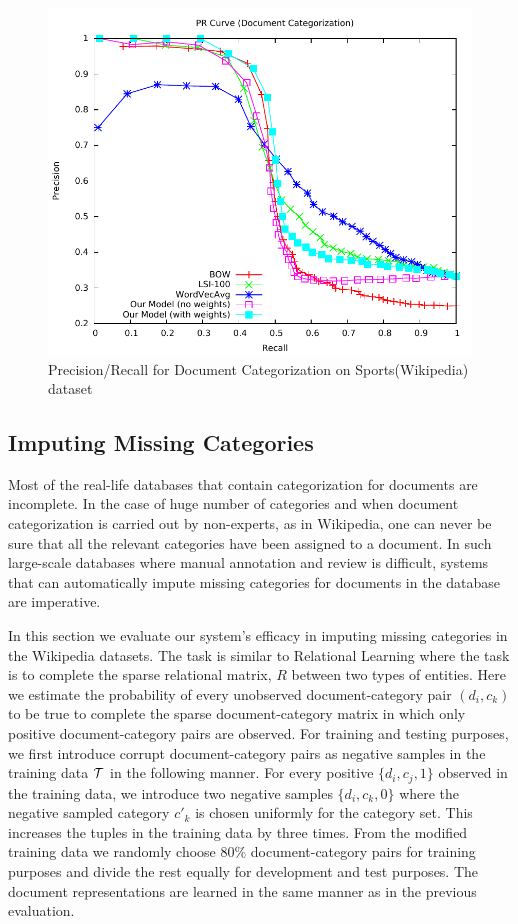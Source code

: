 \begin{figure}[tb]
\centering
        \includegraphics[width=0.8\columnwidth]{figs/pr/sports-cs-scala.pdf}
        \vskip -4mm
    \caption{Precision/Recall for Document Categorization on Sports(Wikipedia) dataset}
    \label{fig:pr:sports:cs} 
\end{figure}

\subsection{Imputing Missing Categories}
\label{sec:results:imputing}
Most of the real-life databases that contain categorization for documents are incomplete. In the case of huge number of categories and when document categorization is carried out by non-experts, as in Wikipedia, one can never be sure that all the relevant categories have been assigned to a document. In such large-scale databases where manual annotation and review is difficult, systems that can automatically impute missing categories for documents in the database are imperative.

In this section we evaluate our system's efficacy in imputing missing categories in the Wikipedia datasets.  
The task is similar to Relational Learning where the task is to complete the sparse relational matrix, $R$ between two types of entities. 
Here we estimate the probability of every unobserved document-category pair $(d_{i}, c_{k})$ to be true to complete the sparse document-category matrix in which only positive document-category pairs are observed.
For training and testing purposes, we first introduce corrupt document-category pairs as negative samples in the training data $\mathcal{T}$ in the following manner. For every positive $\{ d_{i}, c_{j}, 1\}$ observed in the training data, we introduce two negative samples $\{ d_{i}, c_{k}, 0\}$ where the negative sampled category $c'_{k}$ is chosen uniformly for the category set. This increases the tuples in the training data by three times. From the modified training data we randomly choose $80\%$ document-category pairs for training purposes and divide the rest equally for development and test purposes. The document representations are learned in the same manner as in the previous evaluation.

